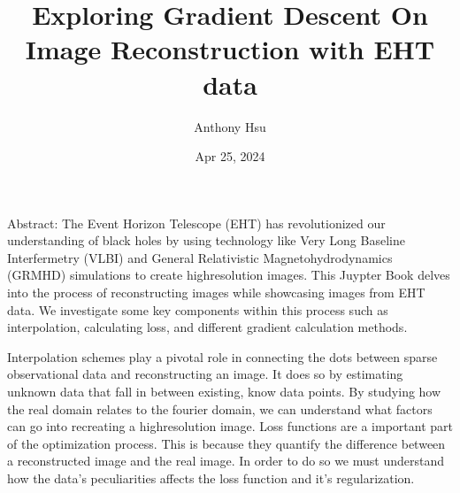 \documentclass[letterpaper,10pt,english]{jupyterBook}
\title{Exploring Gradient Descent On Image Reconstruction with EHT data}
\date{Apr 25, 2024}
\author{Anthony Hsu}
\begin{document}
\pagestyle{empty}
\sphinxmaketitle
\pagestyle{plain}
\sphinxtableofcontents
\pagestyle{normal}
\label{\detokenize{intro::doc}}


\begin{DUlineblock}{0em}
\item[] 
\end{DUlineblock}

\sphinxAtStartPar
Abstract:
The Event Horizon Telescope (EHT) has revolutionized our understanding of black holes by using technology like Very Long Baseline Interfermetry (VLBI) and General Relativistic Magnetohydrodynamics (GRMHD) simulations to create high\sphinxhyphen{}resolution images.
This Juypter Book delves into the process of reconstructing images while showcasing images from EHT data. We investigate some key components within this process such as interpolation, calculating loss, and different gradient calculation methods.

\sphinxAtStartPar
Interpolation schemes play a pivotal role in connecting the dots between sparse observational data and reconstructing an image. It does so by estimating unknown data that fall in between existing, know data points. By studying how the real domain relates to the fourier domain, we can understand what factors can go into recreating a high\sphinxhyphen{}resolution image. Loss functions are a important part of the optimization process. This is because they quantify the difference between a reconstructed image and the real image. In order to do so we must understand how the data’s peculiarities affects the loss function and it’s regularization.
\end{document}
